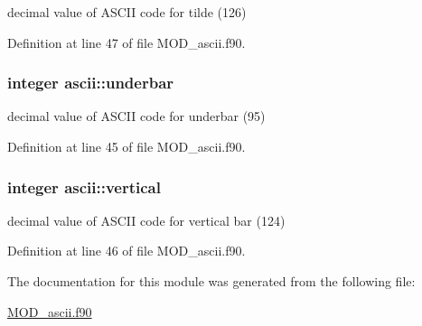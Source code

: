 decimal value of A\-S\-C\-I\-I code for tilde (126) 



Definition at line 47 of file M\-O\-D\-\_\-ascii.\-f90.

\hypertarget{classascii_ac283ef49a83661efda871957fb88f00e}{
\subsubsection[{underbar}]{\setlength{\rightskip}{0pt plus 5cm}integer ascii\-::underbar}}\label{classascii_ac283ef49a83661efda871957fb88f00e}


decimal value of A\-S\-C\-I\-I code for underbar (95) 



Definition at line 45 of file M\-O\-D\-\_\-ascii.\-f90.

\hypertarget{classascii_abe4af91532cec1903358ba9db8059a12}{
\subsubsection[{vertical}]{\setlength{\rightskip}{0pt plus 5cm}integer ascii\-::vertical}}\label{classascii_abe4af91532cec1903358ba9db8059a12}


decimal value of A\-S\-C\-I\-I code for vertical bar (124) 



Definition at line 46 of file M\-O\-D\-\_\-ascii.\-f90.



The documentation for this module was generated from the following file\-:\begin{DoxyCompactItemize}
\item 
\hyperlink{MOD__ascii_8f90}{M\-O\-D\-\_\-ascii.\-f90}\end{DoxyCompactItemize}

